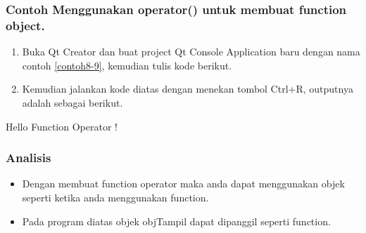\subsubsection*{Contoh Menggunakan operator() untuk membuat function object.}

\begin{enumerate}

\item
 Buka Qt Creator dan buat project Qt Console Application baru dengan
 nama contoh \ref{contoh8-9}, kemudian tulis kode berikut.




\item
 Kemudian jalankan kode diatas dengan menekan tombol Ctrl+R, outputnya
 adalah sebagai berikut.
\end{enumerate}

\begin{lcverbatim}
Hello Function Operator !
\end{lcverbatim}

\subsubsection*{Analisis}

\begin{itemize}

\item
 Dengan membuat function operator maka anda dapat menggunakan objek
 seperti ketika anda menggunakan function.
\item
 Pada program diatas objek objTampil dapat dipanggil seperti function.
\end{itemize}
